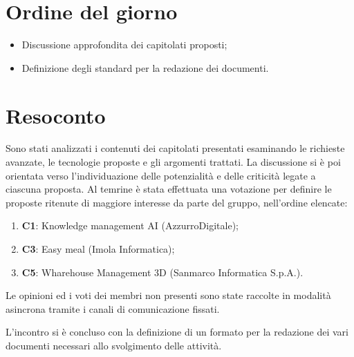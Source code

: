 \section{Ordine del giorno}
\begin{itemize}
    \item Discussione approfondita dei capitolati proposti;
    \item Definizione degli standard per la redazione dei documenti.
\end{itemize}

\section{Resoconto}
Sono stati analizzati i contenuti dei capitolati presentati esaminando le richieste avanzate, le tecnologie proposte e gli argomenti trattati.
La discussione si è poi orientata verso l'individuazione delle potenzialità e delle criticità legate a ciascuna proposta. 
Al temrine è stata effettuata una votazione per definire le proposte ritenute di maggiore interesse da parte del gruppo, nell'ordine elencate:
\begin{enumerate}
    \item \textbf{C1}: Knowledge management AI (AzzurroDigitale);
    \item \textbf{C3}: Easy meal (Imola Informatica);
    \item \textbf{C5}: Wharehouse Management 3D (Sanmarco Informatica S.p.A.).
\end{enumerate}
Le opinioni ed i voti dei membri non presenti sono state raccolte in modalità asincrona tramite i canali di comunicazione fissati.

L'incontro si è concluso con la definizione di un formato per la redazione dei vari documenti necessari allo svolgimento delle attività.